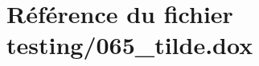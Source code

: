 \hypertarget{065__tilde_8dox}{}\section{Référence du fichier testing/065\+\_\+tilde.dox}
\label{065__tilde_8dox}
